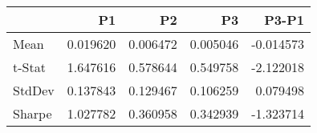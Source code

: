 \begin{tabular}{lrrrr}
\toprule
 & P1 & P2 & P3 & P3-P1 \\
\midrule
Mean & 0.019620 & 0.006472 & 0.005046 & -0.014573 \\
t-Stat & 1.647616 & 0.578644 & 0.549758 & -2.122018 \\
StdDev & 0.137843 & 0.129467 & 0.106259 & 0.079498 \\
Sharpe & 1.027782 & 0.360958 & 0.342939 & -1.323714 \\
\bottomrule
\end{tabular}
